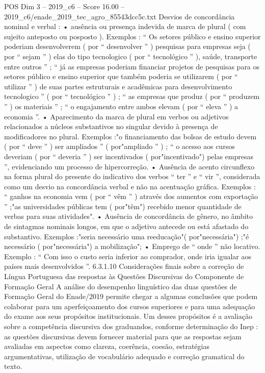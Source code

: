 \begin{textsample}{POS Dim 3 – 2019\_c6 – Score 16.00 – 2019\_c6/enade\_2019\_tec\_agro\_85543dcc5c.txt}
Desvios de concordância nominal e verbal : • ausência ou presença indevida de marca de plural ( com sujeito anteposto ou posposto ).
Exemplos : “ Os setores público e ensino superior poderiam desenvolverem ( por “ desenvolver ” ) pesquisas para empresas seja ( por “ sejam ” ) elas do tipo tecnologico ( por “ tecnológico ” ), saúde, transporte entre outros ” ; “ já as empresas poderiam financiar projetos de pesquisas para os setores público e ensino superior que também poderia se utilizarem ( por “ utilizar ” ) de suas partes estruturais e acadêmicas para desenvolvimento tecnologico ” ( por “ tecnológico ” ) ; “ as empresas que produz ( por “ produzem ” ) os materiais ” ; “ o engajamento entre ambos elevam ( por “ eleva ” ) a economia ”. • Aparecimento da marca de plural em verbos ou adjetivos relacionados a núcleos substantivos no singular devido à presença de modificadores no plural.
Exemplos :"o financiamento das bolsas de estudo devem ( por “ deve ” ) ser ampliados ” ( por"ampliado ” ) ; “ o acesso aos cursos deveriam ( por “ deveria ” ) ser incentivados ( por"incentivado") pelas empresas ”, evidenciando um processo de hipercorreção. • Ausência de acento circunflexo na forma plural do presente do indicativo dos verbos “ ter ” e “ vir ”, considerada como um desvio na concordância verbal e não na acentuação gráfica.
Exemplos : “ ganhos na economia vem ( por “ vêm ” ) através dos aumentos com exportação ” ;"as universidades públicas tem ( por"têm") recebido menor quantidade de verbas para suas atividades". • Ausência de concordância de gênero, no âmbito de sintagmas nominais longos, em que o adjetivo antecede ou está afastado do substantivo.
Exemplos :"seria necessário uma reeducação"( por"necessária") ;"é necessário ( por"necessária") a mobilização"; • Emprego de “ onde ” não locativo.
Exemplo : “ Com isso o custo seria inferior ao comprador, onde iria igualar aos países mais desenvolvidos ”. 6.3.1.10 Considerações finais sobre a correção de Língua Portuguesa das respostas às Questões Discursivas do Componente de Formação Geral A análise do desempenho linguístico das duas questões de Formação Geral do Enade/2019 permite chegar a algumas conclusões que podem colaborar para um aperfeiçoamento dos cursos superiores e para uma adequação do exame aos seus propósitos institucionais.
Um desses propósitos é a avaliação sobre a competência discursiva dos graduandos, conforme determinação do Inep : as questões discursivas devem fornecer material para que as respostas sejam avaliadas em aspectos como clareza, coerência, coesão, estratégias argumentativas, utilização de vocabulário adequado e correção gramatical do texto.

\end{textsample}
